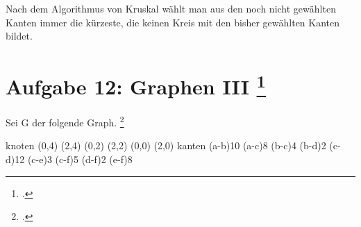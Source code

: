 \documentclass{lehramt-informatik}
\begin{document}
Nach dem Algorithmus von Kruskal wählt man aus den noch nicht gewählten
Kanten immer die kürzeste, die keinen Kreis mit den bisher gewählten
Kanten bildet.

%

\section{Aufgabe 12: Graphen III
\footcite[(entnommen aus Algorithmen und Datenstrukturen, Übungsblatt 7, Universität Würzburg)]{aud:pu:7}}

Sei G der folgende Graph.
\footcite[Staatsexamen Theoretische Informatik, Algorithmen und Datenstrukturen, Realschulen, Frühjahr 2018, Thema 2, Aufgabe 4 (gekürzt)]{examen:46115:2018:03}

\graph knoten {
  (0,4)
  (2,4)
  (0,2)
  (2,2)
  (0,0)
  (2,0)
} kanten {
  \kante(a-b){10}
  \kante(a-c){8}
  \kante(b-c){4}
  \kante(b-d){2}
  \kante(c-d){12}
  \kante(c-e){3}
  \kante(c-f){5}
  \kante(d-f){2}
  \kante(e-f){8}
}
\end{document}
